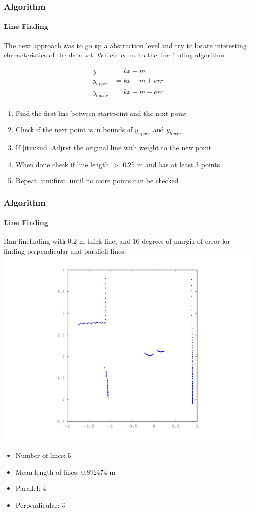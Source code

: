 \documentclass{beamer}
\begin{document}
\begin{frame}
\frametitle{Algorithm}
\framesubtitle{Line Finding}

The next approach was to go up a abstraction level and try to locate interesting characteristics of the data set.
Which led us to the line finding algorithm.
\pause

\begin{equation} \label{eq1}
\begin{split}
y & = kx + m \\
y_{upper}  & =  kx + m + err \\
y_{lower} & = kx + m - err \\
\end{split}
\end{equation}
\begin{enumerate}
\pause
\item{\label{itm:first}Find the first line between startpoint and the next point}
\item{\label{itm:snd}Check if the next point is in bounds of $y_{upper}$ and $y_{lower}$}
\item{If \ref{itm:snd} Adjust the original line with weight to the new point}
\item{When done check if line length $>$ 0.25 m and has at least 3 points}
\item{Repeat \ref{itm:first} until no more points can be checked}
\end{enumerate}


\end{frame}

\begin{frame}
\frametitle{Algorithm}
\framesubtitle{Line Finding}
Ran linefinding with 0.2 m thick line, and 10 degrees of margin of error for finding perpendicular and parallell lines.
\includegraphics[scale=0.3]{presimg/human.jpg}
\begin{itemize}
\item{Number of lines: 5}
\item{Mean length of lines: 0.892474 m}
\item{Parallel: 4}
\item{Perpendicular: 3}
\end{itemize}


\end{frame}
\end{document}

